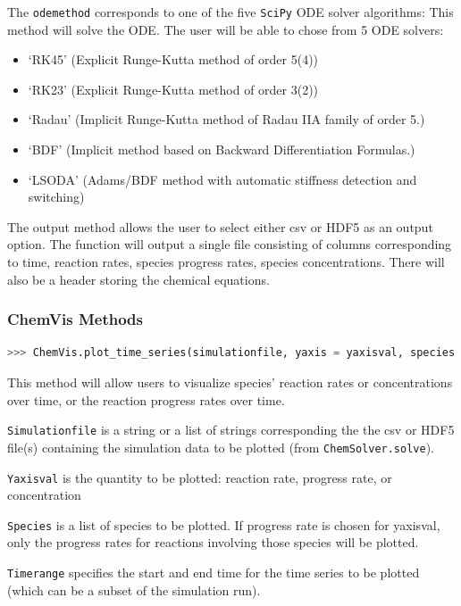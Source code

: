 \documentclass[12pt]{article}
\begin{document}
The \texttt{odemethod} corresponds to one of the five \texttt{SciPy} ODE solver algorithms: 
This method will solve the ODE. The user will be able to chose from 5 ODE solvers: 
\begin{itemize}
\item ‘RK45’ (Explicit Runge-Kutta method of order 5(4))
\item ‘RK23’ (Explicit Runge-Kutta method of order 3(2))
\item ‘Radau’ (Implicit Runge-Kutta method of Radau IIA family of order 5.)
\item ‘BDF’ (Implicit method based on Backward Differentiation Formulas.)
\item ‘LSODA’ (Adams/BDF method with automatic stiffness detection and switching)
\end{itemize}

The output method allows the user to select either csv or HDF5 as an output option. The function will output a single file consisting of columns corresponding to time, reaction rates, species progress rates, species concentrations. There will also be a header storing the chemical equations. 


\subsubsection*{ChemVis Methods}

\begin{lstlisting}[language = Python, basicstyle = \ttfamily, breaklines = True, columns = fullflexible]
>>> ChemVis.plot_time_series(simulationfile, yaxis = yaxisval, species = [list of species], timerange = timerange)
\end{lstlisting}


This method will allow users to visualize species’ reaction rates or concentrations over time, or the reaction progress rates over time. 

\texttt{Simulationfile} is a string or a list of strings corresponding the the csv or HDF5 file(s) containing the simulation data to be plotted (from \texttt{ChemSolver.solve}).

\texttt{Yaxisval} is the quantity to be plotted: reaction rate, progress rate, or concentration

\texttt{Species} is a list of species to be plotted. If progress rate is chosen for yaxisval, only the progress rates for reactions involving those species will be plotted. 

\texttt{Timerange} specifies the start and end time for the time series to be plotted (which can be a subset of the simulation run). 
\end{document}
